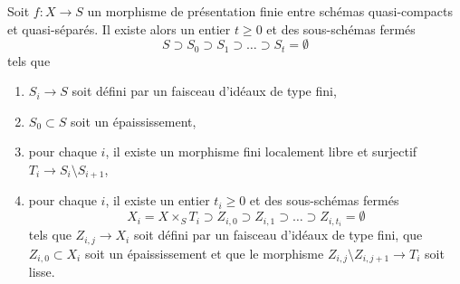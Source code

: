\begin{lemma}
\label{lemma-smoothness-stratification}
Soit $f : X \to S$ un morphisme de présentation finie entre schémas quasi-compacts
et quasi-séparés. Il existe alors un entier $t \geq 0$ et des
sous-schémas fermés
$$
S \supset S_0 \supset S_1 \supset \ldots \supset S_t = \emptyset
$$
tels que
\begin{enumerate}
\item $S_i \to S$ soit défini par un faisceau d'idéaux de type fini,
\item $S_0 \subset S$ soit un épaississement,
\item pour chaque $i$, il existe un morphisme fini localement libre et surjectif
$T_i \to S_i \setminus S_{i + 1}$,
\item pour chaque $i$, il existe un entier $t_i \geq 0$ et des sous-schémas fermés
$$
X_i = X \times_S T_i \supset Z_{i, 0}
\supset Z_{i, 1} \supset \ldots \supset Z_{i, t_i} = \emptyset
$$
tels que $Z_{i, j} \to X_i$ soit défini par un faisceau d'idéaux de type fini,
que $Z_{i, 0} \subset X_i$ soit un épaississement et que le morphisme
$Z_{i, j} \setminus Z_{i, j + 1} \to T_i$ soit lisse.
\end{enumerate}
\end{lemma}

